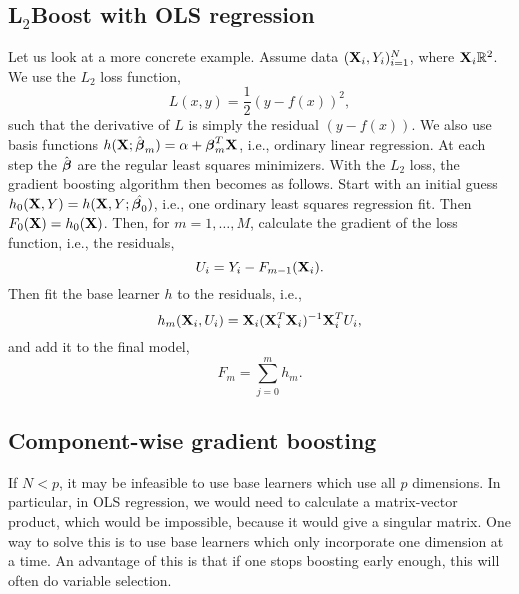 \subsection{L$_2$Boost with OLS regression}
Let us look at a more concrete example. Assume data $(\mathbf{X}_i,Y_i)_{i=1}^N$, where $\mathbf{X}_i\mathbb{R}^2$. We use the $L_2$ loss function,
\begin{equation}\label{l2}
    L(x,y)=\frac{1}{2}\left(y-f(x)\right)^2,
\end{equation}
such that the derivative of $L$ is simply the residual $(y-f(x))$. We also use basis functions $h(\mathbf{X};\hat{\boldsymbol{\beta}}_m)=\alpha + \boldsymbol{\beta}_m^T\mathbf{X}$, i.e., ordinary linear regression. At each step the $\hat{\boldsymbol{\beta}}$ are the regular least squares minimizers. With the $L_2$ loss, the gradient boosting algorithm then becomes as follows. Start with an initial guess $h_0(\mathbf{X},Y)=h(\mathbf{X},Y;\hat{\boldsymbol{\beta}_0})$, i.e., one ordinary least squares regression fit. Then $F_0(\mathbf{X})=h_0(\mathbf{X})$. Then, for $m=1,\dotsc,M$, calculate the gradient of the loss function, i.e., the residuals,
\begin{equation}\label{residuals}
    U_i=Y_i-F_{m-1}(\mathbf{X}_i).
\end{equation}
Then fit the base learner $h$ to the residuals, i.e.,
\begin{equation}
    h_m(\mathbf{X}_i,U_i)=\mathbf{X}_i(\mathbf{X}_i^T\mathbf{X}_i)^{-1}\mathbf{X}_i^TU_i,
\end{equation}
and add it to the final model,
\begin{equation}
    F_m=\sum_{j=0}^m h_m.
\end{equation}

\subsection{Component-wise gradient boosting}
If $N < p$, it may be infeasible to use base learners which use all $p$ dimensions. In particular, in OLS regression, we would need to calculate a matrix-vector product, which would be impossible, because it would give a singular matrix. One way to solve this is to use base learners which only incorporate one dimension at a time. An advantage of this is that if one stops boosting early enough, this will often do variable selection. 